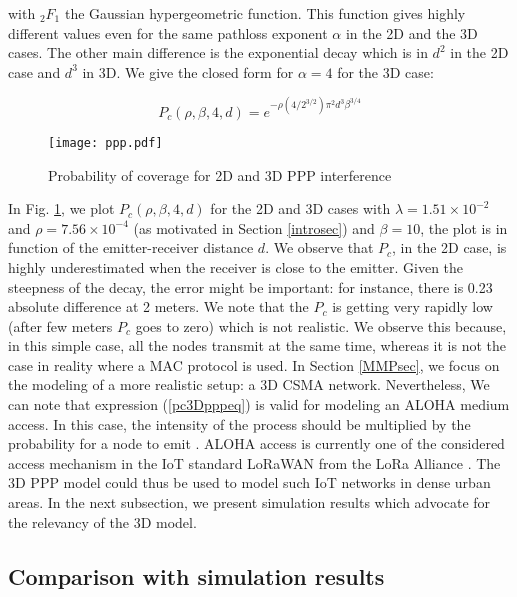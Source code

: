 \documentclass{sig-alternate-05-2015}
\begin{document}
with ${}_2F_1$ the Gaussian hypergeometric function. This function gives highly different values even for the same pathloss exponent $\alpha$ in the 2D and the 3D cases. The other main difference is the exponential decay which is in $d^2$ in the 2D case and $d^3$ in 3D. We give the closed form for $\alpha=4$ for the 3D case:

\begin{equation}
 \label{pc3Dpppeq}
 P_c(\rho,\beta,4,d)=e^{-\rho (4/2^{3/2})  \pi^2 d^3 \beta^{3/4}}
\end{equation}

\begin{figure}[ht]
  \centering
  \texttt{[image: ppp.pdf]}
  \caption{Probability of coverage for 2D and 3D PPP interference}
  \label{pppfig}
\end{figure}

In Fig. \ref{pppfig}, we plot $P_c(\rho,\beta,4,d)$ for the 2D and 3D cases with $\lambda=1.51\times 10^{-2}$ and $\rho=7.56\times 10^{-4}$ (as motivated in Section \ref{introsec}) and $\beta=10$, the plot is in function of the emitter-receiver distance $d$. We observe that $P_c$, in the 2D case, is highly underestimated when the receiver is close to the emitter. Given the steepness of the decay, the error might be important: for instance, there is 0.23 absolute difference at 2 meters. We note that the $P_c$ is getting very rapidly low (after few meters $P_c$ goes to zero) which is not realistic. We observe this because, in this simple case, all the nodes transmit at the same time, whereas it is not the case in reality where a MAC protocol is used. 
In Section \ref{MMPsec}, we focus on the modeling of a more realistic setup: a 3D CSMA network. Nevertheless, We can note that expression (\ref{pc3Dpppeq}) is valid for modeling an ALOHA medium access. In this case, the intensity of the process should be multiplied by the probability for a node to emit \cite{baccelli09}. ALOHA access is currently one of the considered access mechanism in the IoT standard LoRaWAN \cite{lorawan} from the LoRa Alliance \cite{loraaliance}. The 3D PPP model could thus be used to model such IoT networks in dense urban areas. In the next subsection, we present simulation results which advocate for the relevancy of the 3D model.


\subsection{Comparison with simulation results}
\label{pppsimsec}
\end{document}
